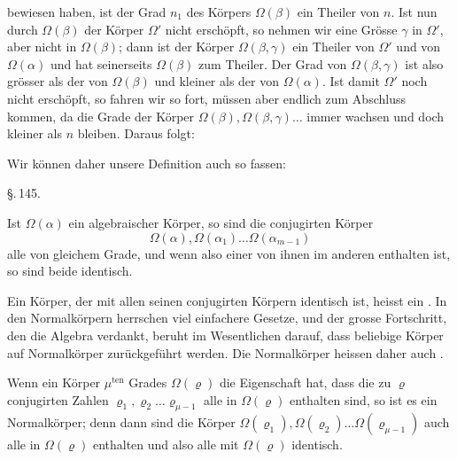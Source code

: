 bewiesen haben, ist der Grad $n_1$ des Körpers $\Omega(\beta)$ ein
Theiler von $n$. Ist nun durch $\Omega(\beta)$ der Körper $\Omega'$
nicht erschöpft, so nehmen wir eine Grösse $\gamma$ in $\Omega'$,
aber nicht in $\Omega(\beta)$; dann ist der Körper $\Omega(\beta,
\gamma)$ ein Theiler von $\Omega'$ und von $\Omega(\alpha)$ und hat
seinerseits $\Omega(\beta)$ zum Theiler. Der Grad von $\Omega(\beta,
\gamma)$ ist also grösser als der von $\Omega(\beta)$ und kleiner
als der von $\Omega(\alpha)$. Ist damit $\Omega'$ noch nicht
erschöpft, so fahren wir so fort, müssen aber endlich zum Abschluss
kommen, da die Grade der Körper $\Omega(\beta), \Omega(\beta,
\gamma) \ldots$ immer wachsen und doch kleiner als $n$ bleiben.
Daraus folgt:


Wir können daher unsere Definition auch so fassen:


\begin{center}
\S.\,145.

\end{center}

Ist $\Omega(\alpha)$ ein algebraischer Körper, so sind die
conjugirten Körper
\[
\Omega(\alpha), \Omega(\alpha_1) \ldots \Omega(\alpha_{m-1})
\]
alle von gleichem Grade, und wenn also einer von ihnen im anderen
enthalten ist, so sind beide identisch.

Ein Körper, der mit allen seinen conjugirten Körpern identisch
ist, heisst ein . In den Normalkörpern
herrschen viel einfachere Gesetze, und der grosse Fortschritt, den
die Algebra  verdankt, beruht im Wesentlichen
darauf, dass beliebige Körper auf Normalkörper zurückgeführt
werden. Die Normalkörper heissen daher auch .

Wenn ein Körper $\mu^{\mathrm{ten}}$ Grades $\Omega(\varrho)$ die
Eigenschaft hat, dass die zu $\varrho$ conjugirten Zahlen $\varrho_1,
\varrho_2 \ldots \varrho_{\mu-1}$ alle in $\Omega(\varrho)$
enthalten sind, so ist es ein Normalkörper; denn dann sind die
Körper $\Omega(\varrho_1), \Omega(\varrho_2) \ldots
\Omega(\varrho_{\mu-1})$ auch alle in $\Omega(\varrho)$ enthalten
und also alle mit $\Omega(\varrho)$ identisch.
